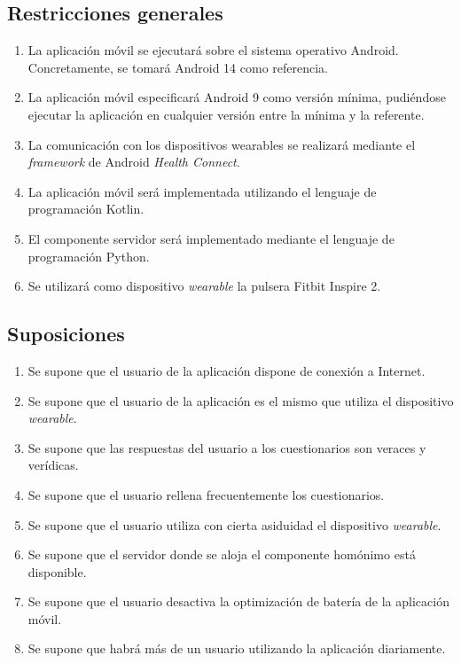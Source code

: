         
    \subsection{Restricciones generales}
        \begin{enumerate}[label=\textbf{RG-\arabic*}]
            \item La aplicación móvil se ejecutará sobre el sistema operativo Android. Concretamente, se tomará Android 14 como referencia.
            \item La aplicación móvil especificará Android 9 como versión mínima, pudiéndose ejecutar la aplicación en cualquier versión entre la mínima y la referente.
            \item La comunicación con los dispositivos wearables se realizará mediante el \textit{framework} de Android \textit{Health Connect}.
            \item La aplicación móvil será implementada utilizando el lenguaje de programación Kotlin.
            \item El componente servidor será implementado mediante el lenguaje de programación Python.
            \item Se utilizará como dispositivo \textit{wearable} la pulsera Fitbit Inspire 2.
        \end{enumerate}
    
    \subsection{Suposiciones}

        \begin{enumerate}[label=\textbf{SUP-\arabic*}]
            \item Se supone que el usuario de la aplicación dispone de conexión a Internet.
            \item Se supone que el usuario de la aplicación es el mismo que utiliza el dispositivo \textit{wearable}.
            \item Se supone que las respuestas del usuario a los cuestionarios son veraces y verídicas.
            \item Se supone que el usuario rellena frecuentemente los cuestionarios.
            \item Se supone que el usuario utiliza con cierta asiduidad el dispositivo \textit{wearable}.
            \item Se supone que el servidor donde se aloja el componente homónimo está disponible.
            \item Se supone que el usuario desactiva la optimización de batería de la aplicación móvil.
            \item Se supone que habrá más de un usuario utilizando la aplicación diariamente.
        \end{enumerate}
        
